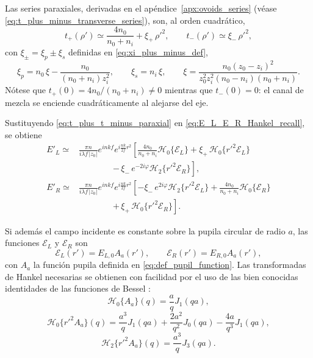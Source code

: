 Las series paraxiales, derivadas en el apéndice~\ref{apx:ovoids_series} (véase \eqref{eq:t_plus_minus_transverse_series}), son, al orden cuadrático,
\begin{equation}
t_+(\rho')
\simeq
\frac{4n_0}{n_0+n_i}
+
\xi_+\,\rho'^2,
\qquad
t_-(\rho')
\simeq
\xi_-\,\rho'^2,
\label{eq:t_plus_t_minus_paraxial}
\end{equation}
con $\xi_\pm=\xi_p\pm\xi_s$ definidas en \eqref{eq:xi_plus_minus_def},
\begin{equation}
\xi_p
=
n_0\,\xi-\frac{n_0}{(n_0+n_i)z_i^2},
\qquad
\xi_s
=
n_i\,\xi,
\qquad
\xi
=
\frac{
n_0(z_0-z_i)^2
}{
z_0^2 z_i^2 (n_0-n_i)(n_0+n_i)
}.
\label{eq:xi_focal_forms}
\end{equation}
Nótese que $t_+(0)=4n_0/(n_0+n_i)\neq 0$ mientras que $t_-(0)=0$: el canal de mezcla se enciende cuadráticamente al alejarse del eje.

Sustituyendo \eqref{eq:t_plus_t_minus_paraxial} en \eqref{eq:E_L_E_R_Hankel_recall}, se obtiene
\begin{equation}
\begin{aligned}
E'_L
\simeq{}&
\frac{\pi n}{i\lambda f\,|z_0|}
e^{inkf}
e^{i\frac{nk}{2f}r^2}
\left[
\frac{4n_0}{n_0+n_i}\mathscr H_0\{\mathscr E_L\}
+
\xi_+\,\mathscr H_0\{r'^2\mathscr E_L\}
\right.
\\
&\qquad\qquad
\left.
-\,
\xi_-\,e^{-2i\varphi}\mathscr H_2\{r'^2\mathscr E_R\}
\right],
\\[1em]
E'_R
\simeq{}&
\frac{\pi n}{i\lambda f\,|z_0|}
e^{inkf}
e^{i\frac{nk}{2f}r^2}
\left[
-\xi_-\,e^{2i\varphi}\mathscr H_2\{r'^2\mathscr E_L\}
+
\frac{4n_0}{n_0+n_i}\mathscr H_0\{\mathscr E_R\}
\right.
\\
&\qquad\qquad
\left.
+\,
\xi_+\,\mathscr H_0\{r'^2\mathscr E_R\}
\right].
\end{aligned}
\label{eq:E_L_E_R_paraxial}
\end{equation}

Si además el campo incidente es constante sobre la pupila circular de radio $a$, las funciones $\mathscr E_L$ y $\mathscr E_R$ son
\begin{equation}
  \mathscr E_L(r')=E_{L,0}A_a(r'),
  \qquad
  \mathscr E_R(r')=E_{R,0}A_a(r'),
\end{equation}
con $A_a$ la función pupila definida en \eqref{eq:def_pupil_function}. Las transformadas de Hankel necesarias se obtienen con facilidad por el uso de las bien conocidas identidades de las funciones de Bessel \cite{arfken2013}:
\begin{equation}
  \mathscr H_0\{A_a\}(q)
  =
  \frac{a}{q}J_1(qa),
  \label{eq:H0_chiR}
\end{equation}
\begin{equation}
  \mathscr H_0\{r'^2A_a\}(q)
  =
  \frac{a^3}{q}J_1(qa)
  +
  \frac{2a^2}{q^2}J_0(qa)
  -
  \frac{4a}{q^3}J_1(qa),
  \label{eq:H0_rho2_chiR}
\end{equation}
\begin{equation}
  \mathscr H_2\{r'^2A_a\}(q)
  =
  \frac{a^3}{q}J_3(qa).
  \label{eq:H2_rho2_chiR}
\end{equation}

